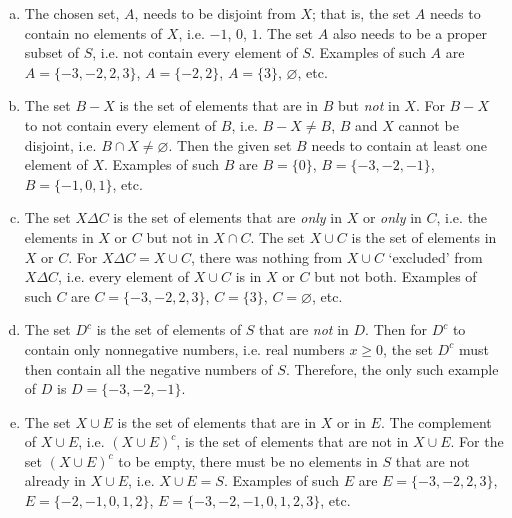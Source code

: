 \documentclass[11pt,letterpaper]{article}
\begin{document}
\begin{enumerate}[(a)]
\item The chosen set, $A$, needs to be disjoint from $X$; that is, the set $A$ needs to contain no elements of $X$, i.e. $-1$, $0$, $1$. The set $A$ also needs to be a proper subset of $S$, i.e. not contain every element of $S$. Examples of such $A$ are $A= \{ -3, -2, 2, 3 \}$, $A= \{ -2, 2 \}$, $A= \{ 3 \}$, $\varnothing$, etc. \pspace

\item The set $B - X$ is the set of elements that are in $B$ but \textit{not} in $X$. For $B - X$ to not contain every element of $B$, i.e. $B - X \neq B$, $B$ and $X$ cannot be disjoint, i.e. $B \cap X \neq \varnothing$. Then the given set $B$ needs to contain at least one element of $X$. Examples of such $B$ are $B= \{ 0 \}$, $B= \{ -3, -2, -1 \}$, $B= \{ -1, 0, 1 \}$, etc. \pspace

\item The set $X \Delta C$ is the set of elements that are \textit{only} in $X$ or \textit{only} in $C$, i.e. the elements in $X$ or $C$ but not in $X \cap C$. The set $X \cup C$ is the set of elements in $X$ or $C$. For $X \Delta C= X \cup C$, there was nothing from $X \cup C$ `excluded' from $X \Delta C$, i.e. every element of $X \cup C$ is in $X$ or $C$ but not both. Examples of such $C$ are $C= \{ -3, -2, 2, 3 \}$, $C= \{ 3 \}$, $C= \varnothing$, etc. \pspace

\item The set $D^c$ is the set of elements of $S$ that are \textit{not} in $D$. Then for $D^c$ to contain only nonnegative numbers, i.e. real numbers $x \geq 0$, the set $D^c$ must then contain all the negative numbers of $S$. Therefore, the only such example of $D$ is $D= \{ -3, -2, -1 \}$. \pspace

\item The set $X \cup E$ is the set of elements that are in $X$ or in $E$. The complement of $X \cup E$, i.e. $(X \cup E)^c$, is the set of elements that are not in $X \cup E$. For the set $(X \cup E)^c$ to be empty, there must be no elements in $S$ that are not already in $X \cup E$, i.e. $X \cup E= S$. Examples of such $E$ are $E= \{ -3, -2, 2, 3 \}$, $E= \{ -2, -1, 0, 1, 2 \}$, $E= \{ -3, -2, -1, 0, 1, 2, 3 \}$, etc. 
\end{enumerate}



\newpage
\end{document}
